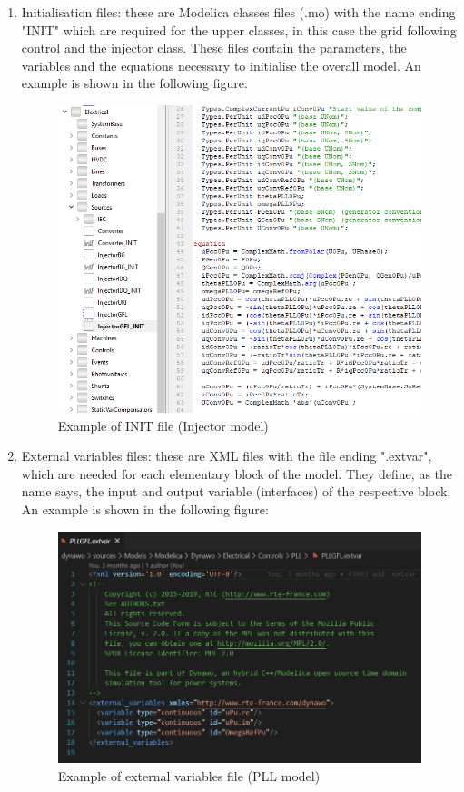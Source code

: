 \documentclass{report}
\begin{document}
\begin{enumerate}
    \item Initialisation files: these are Modelica classes files (.mo) with the name ending "INIT" which are required for the upper classes, in this case the grid following control and the injector class. These files contain the parameters, the variables and the equations necessary to initialise the overall model. An example is shown in the following figure:
    \begin{figure}[H]
    \centering
    \includegraphics[scale = 0.5]{Figure_1VSC/InjectorGFL_INIT_Modelica.PNG}
    \caption{Example of INIT file (Injector model)}
    \label{fig:InjectorGFL_INIT_Modelica}
    \end{figure}
    
    
    \item External variables files: these are XML files with the file ending ".extvar", which are needed for each elementary block of the model. They define, as the name says, the input and output variable (interfaces) of the respective block. An example is shown in the following figure:
    \begin{figure}[H]
    \centering
    \includegraphics[scale = 0.5]{Figure_1VSC/PLLGFL_extvar_Dynawo.PNG}
    \caption{Example of external variables file (PLL model)}
    \label{fig:PLLGFL_extvar_Dynawo}
    \end{figure}


\end{enumerate}
\end{document}
